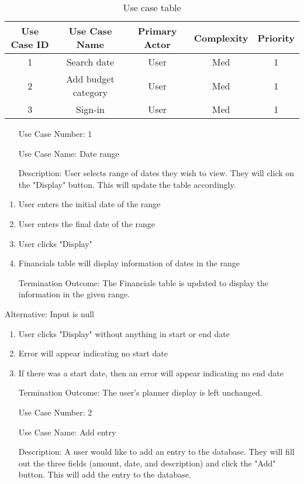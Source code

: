 \documentclass[10pt,conference,onecolumn,compsoc]{IEEEtran}
\begin{document}
\begin{table}
\centering
\begin{tabular}{|c|c|c|c|c|}
\hline
Use Case ID & Use Case Name & Primary Actor & Complexity & Priority \\
\hline \hline
1 & Search date & User & Med & 1\\
\hline
2 & Add budget category & User & Med & 1\\
\hline
3 & Sign-in & User & Med & 1\\
\hline

\end{tabular}
\caption{Use case table}
\label{tab:useCaseIndex}
\end{table}

\begin{itemize}
\item[Use Case Number:] 1
\item[Use Case Name:] Date range
\item[Description:] User selects range of dates they wish to view. They will click on the "Display" button. This will update the table accordingly.
\end{itemize}

\begin{enumerate}
\item User enters the initial date of the range
\item User enters the final date of the range
\item User clicks "Display"
\item Financials table will display information of dates in the range
\item[Termination Outcome:] The Financials table is updated to display the information in the given range.
\end{enumerate}

Alternative: Input is null
\begin{enumerate}
\item User clicks "Display" without anything in start or end date
\item Error will appear indicating no start date
\item If there was a start date, then an error will appear indicating no end date
\item[Termination Outcome:] The user's planner display is left unchanged.
\end{enumerate}

\begin{itemize}
\item[Use Case Number:] 2
\item[Use Case Name:] Add entry
\item[Description:] A user would like to add an entry to the database. They will fill out the three fields (amount, date, and description) and click the "Add" button. This will add the entry to the database.
\end{itemize}
\end{document}
